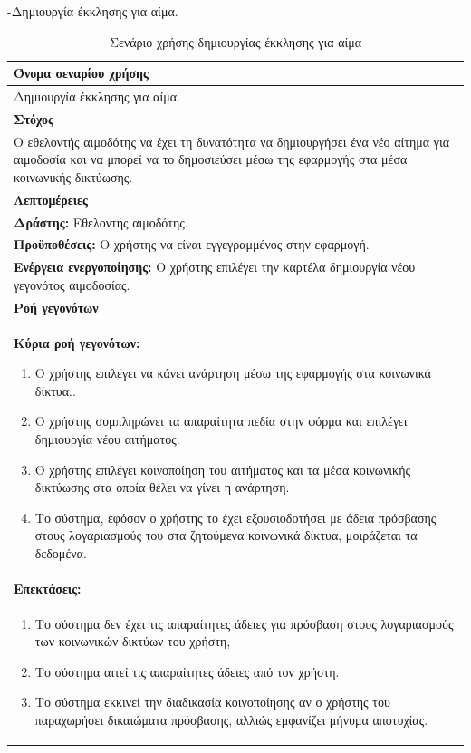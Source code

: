 \newpage
-Δημιουργία έκκλησης για αίμα.
\begin{table}[H]
	\begin{center}
	    \begin{tabular}{|p{\dimexpr \linewidth-2\tabcolsep}|}
	    \hline
	    \rowcolor{grayy}
	    \textbf{Όνομα σεναρίου χρήσης}
	    \\ \hline    
	    Δημιουργία έκκλησης για αίμα.
	     \\ \hline
	    \rowcolor{grayy}
	    \textbf{\textbf{Στόχος}}
	    \\ \hline
	 	 Ο εθελοντής αιμοδότης να έχει τη δυνατότητα να δημιουργήσει ένα νέο αίτημα για αιμοδοσία και να μπορεί να το δημοσιεύσει μέσω της εφαρμογής στα μέσα κοινωνικής δικτύωσης.
	    \\ \hline
	    \rowcolor{grayy}
	    \textbf{Λεπτομέρειες}
	    \\ \hline
		\textbf{Δράστης:} Εθελοντής αιμοδότης.
		\\*
		\textbf{Προϋποθέσεις:} Ο χρήστης να είναι εγγεγραμμένος στην εφαρμογή.
		\\*
		\textbf{Ενέργεια ενεργοποίησης:} Ο χρήστης επιλέγει την καρτέλα δημιουργία νέου γεγονότος αιμοδοσίας.
		\\ \hline
		\rowcolor{grayy}    
	    \textbf{Ροή γεγονότων}
	    \\ \hline
		\textbf{Κύρια ροή γεγονότων:}
		\begin{enumerate}
		\item	 Ο χρήστης επιλέγει να κάνει ανάρτηση μέσω της εφαρμογής  στα κοινωνικά δίκτυα..
		\item Ο χρήστης συμπληρώνει τα απαραίτητα πεδία στην φόρμα και επιλέγει δημιουργία νέου αιτήματος.
		\item Ο χρήστης επιλέγει κοινοποίηση του αιτήματος και τα μέσα κοινωνικής δικτύωσης στα οποία θέλει να γίνει η ανάρτηση.
	   \item Το σύστημα, εφόσον ο χρήστης το έχει εξουσιοδοτήσει με άδεια πρόσβασης στους λογαριασμούς του στα ζητούμενα κοινωνικά δίκτυα, μοιράζεται τα δεδομένα.
		\end{enumerate}
		\\ \hline
		\rowcolor{grayy}
		\textbf{Επεκτάσεις:}
		   \\ \hline
		\begin{enumerate}
			\item Το σύστημα δεν έχει τις απαραίτητες άδειες για πρόσβαση στους λογαριασμούς των κοινωνικών δικτύων του χρήστη,
			\item Το σύστημα αιτεί τις απαραίτητες άδειες από τον χρήστη.
			\item Το σύστημα εκκινεί την διαδικασία κοινοποίησης αν ο χρήστης του παραχωρήσει δικαιώματα πρόσβασης, αλλιώς εμφανίζει μήνυμα αποτυχίας.
		\end{enumerate}
		\\ \hline
	    \end{tabular}
	    \caption{Σενάριο χρήσης δημιουργίας έκκλησης για αίμα}
	    \label{tab:create_blood_donor_request} 
	\end{center}
\end{table}

